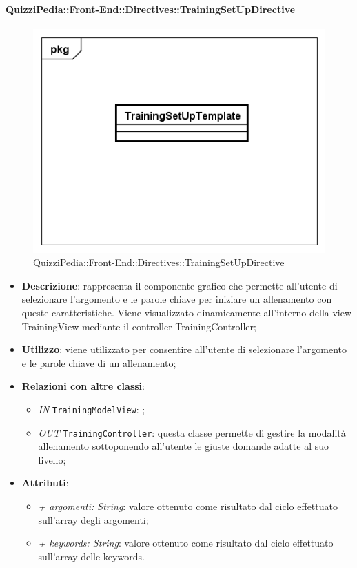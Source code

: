 		\paragraph{QuizziPedia::Front-End::Directives::TrainingSetUpDirective}
		
		\label{QuizziPedia::Front-End::Directives::TrainingSetUpDirective}
		
		\begin{figure}[ht]
			\centering
			\includegraphics[scale=0.5,keepaspectratio]{UML/Classi/Front-End/QuizziPedia_Front-end_Templates_TrainingSetUpTemplate.png}
			\caption{QuizziPedia::Front-End::Directives::TrainingSetUpDirective}
		\end{figure} \FloatBarrier
		
		\begin{itemize}
			\item \textbf{Descrizione}: rappresenta il componente grafico che permette all'utente di selezionare l'argomento e le parole chiave per iniziare un allenamento con queste caratteristiche. Viene visualizzato dinamicamente all'interno della view TrainingView mediante il controller TrainingController;
			\item \textbf{Utilizzo}: viene utilizzato per consentire all'utente di selezionare l'argomento e le parole chiave di un allenamento;
			\item \textbf{Relazioni con altre classi}: 
			\begin{itemize}
				\item \textit{IN} \texttt{TrainingModelView}: ; 
				\item \textit{OUT} \texttt{TrainingController}: questa classe permette di gestire la modalità allenamento sottoponendo all'utente le giuste domande adatte al suo livello;
			\end{itemize}
			\item \textbf{Attributi}: 
			\begin{itemize}
					\item \textit{+ argomenti: String}: valore ottenuto come risultato dal ciclo effettuato sull'array degli argomenti;
					\item \textit{+ keywords: String}: valore ottenuto come risultato dal ciclo effettuato sull'array delle keywords.
			\end{itemize}
		\end{itemize}
		
